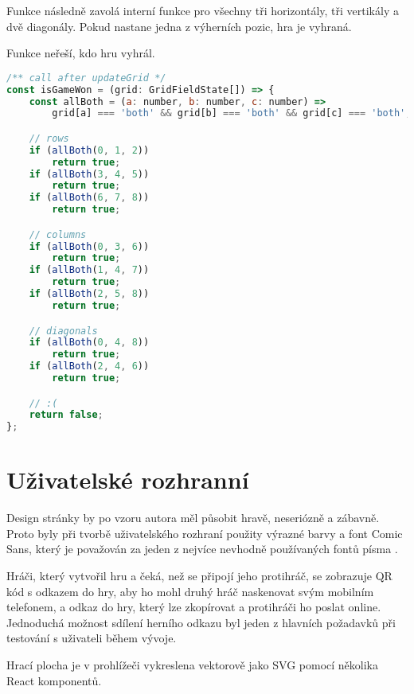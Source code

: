 Funkce  následně zavolá interní funkce  pro všechny tři
horizontály, tři vertikály a dvě diagonály. Pokud nastane jedna z výherních
pozic, hra je vyhraná.

Funkce neřeší, kdo hru vyhrál.

\begin{lstlisting}[language=JavaScript,caption={Funkce \M{isGameWon}},label={lst:is-game-won}]
/** call after updateGrid */
const isGameWon = (grid: GridFieldState[]) => {
    const allBoth = (a: number, b: number, c: number) =>
        grid[a] === 'both' && grid[b] === 'both' && grid[c] === 'both';

    // rows
    if (allBoth(0, 1, 2))
        return true;
    if (allBoth(3, 4, 5))
        return true;
    if (allBoth(6, 7, 8))
        return true;

    // columns
    if (allBoth(0, 3, 6))
        return true;
    if (allBoth(1, 4, 7))
        return true;
    if (allBoth(2, 5, 8))
        return true;

    // diagonals
    if (allBoth(0, 4, 8))
        return true;
    if (allBoth(2, 4, 6))
        return true;

    // :(
    return false;
};
\end{lstlisting}

\section{Uživatelské rozhranní}

Design stránky by po vzoru autora měl působit hravě, neseriózně a zábavně.
Proto byly při tvorbě uživatelského rozhraní použity výrazné barvy a font Comic
Sans, který je považován za jeden z nejvíce nevhodně používaných fontů písma
\cite{seddon2011}.

Hráči, který vytvořil hru a čeká, než se připojí jeho protihráč, se zobrazuje
QR kód s odkazem do hry, aby ho mohl druhý hráč naskenovat svým mobilním
telefonem, a odkaz do hry, který lze zkopírovat a protihráči ho poslat online.
Jednoduchá možnost sdílení herního odkazu byl jeden z hlavních požadavků při
testování s uživateli během vývoje.

Hrací plocha je v prohlížeči vykreslena vektorově jako SVG pomocí několika
React komponentů.
